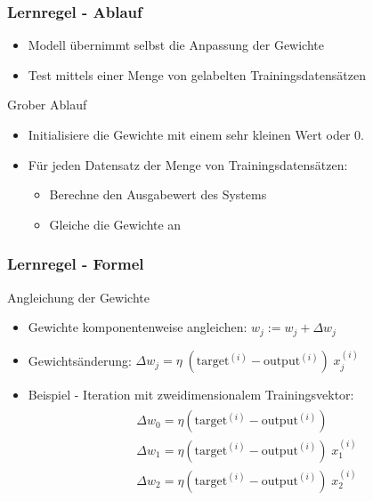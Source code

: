 \begin{frame}
\frametitle{Lernregel - Ablauf}

\begin{itemize}
\item Modell übernimmt selbst die Anpassung der Gewichte
\item Test mittels einer Menge von gelabelten Trainingsdatensätzen
\end{itemize}
\hspace{1mm}

\begin{block}{Grober Ablauf}
\begin{itemize}
\item Initialisiere die Gewichte mit einem sehr kleinen Wert oder 0.
\item Für jeden Datensatz der Menge von Trainingsdatensätzen:
\begin{itemize}
	\item Berechne den Ausgabewert des Systems
	\item Gleiche die Gewichte an
\end{itemize}
\end{itemize}
\end{block}

\end{frame}


\begin{frame}
\frametitle{Lernregel - Formel}

\begin{block}{Angleichung der Gewichte}
\begin{itemize}
\item Gewichte komponentenweise angleichen: $w_j := w_j + \Delta w_j$
\item Gewichtsänderung: $\Delta w_j = \eta \; (\text{target}^{(i)} - \text{output}^{(i)})\;x^{(i)}_{j}$
\end{itemize}
\end{block}

\begin{itemize}
\item Beispiel - Iteration mit zweidimensionalem Trainingsvektor:
\begin{align*}
\begin{aligned}
& \Delta w_0 = \eta(\text{target}^{(i)} - \text{output}^{(i)}) \\
& \Delta w_1 = \eta(\text{target}^{(i)} - \text{output}^{(i)})\;x^{(i)}_{1} \\
& \Delta w_2 = \eta(\text{target}^{(i)} - \text{output}^{(i)})\;x^{(i)}_{2}
\end{aligned}
\end{align*}
\end{itemize}
\end{frame}


